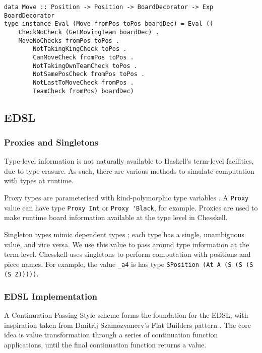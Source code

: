 \documentclass[12pt, a4paper, bibliography=totocnumbered]{scrartcl}
\begin{document}
\begin{lstlisting}
data Move :: Position -> Position -> BoardDecorator -> Exp BoardDecorator
type instance Eval (Move fromPos toPos boardDec) = Eval ((
    CheckNoCheck (GetMovingTeam boardDec) .
    MoveNoChecks fromPos toPos .
        NotTakingKingCheck toPos .
        CanMoveCheck fromPos toPos .
        NotTakingOwnTeamCheck toPos .
        NotSamePosCheck fromPos toPos .
        NotLastToMoveCheck fromPos .
        TeamCheck fromPos) boardDec)
\end{lstlisting}

\subsection{EDSL}

\subsubsection{Proxies and Singletons}

Type-level information is not naturally available to Haskell's term-level facilities, due to type erasure. As such, there are various methods to simulate computation with types at runtime.

Proxy types are parameterised with kind-polymorphic type variables \cite{yorgey2012giving}. A \lstinline[basicstyle=\ttfamily]{Proxy} value can have type \lstinline[basicstyle=\ttfamily]{Proxy Int} or \lstinline[basicstyle=\ttfamily]{Proxy 'Black}, for example. Proxies are used to make runtime board information available at the type level in Chesskell.

Singleton types mimic dependent types \cite{singletons}; each type has a single, unambiguous value, and vice versa. We use this value to pass around type information at the term-level. Chesskell uses singletons to perform computation with positions and piece names. For example, the value \lstinline[basicstyle=\ttfamily]{_a4} is has type \lstinline[basicstyle=\ttfamily]{SPosition (At A (S (S (S (S Z)))))}.

\subsubsection{EDSL Implementation}

A Continuation Passing Style \cite{cps} scheme forms the foundation for the EDSL, with inspiration taken from Dmitrij Szamozvancev's Flat Builders pattern \cite{mezzo}. The core idea is value transformation through a series of continuation function applications, until the final continuation function returns a value.
\end{document}
